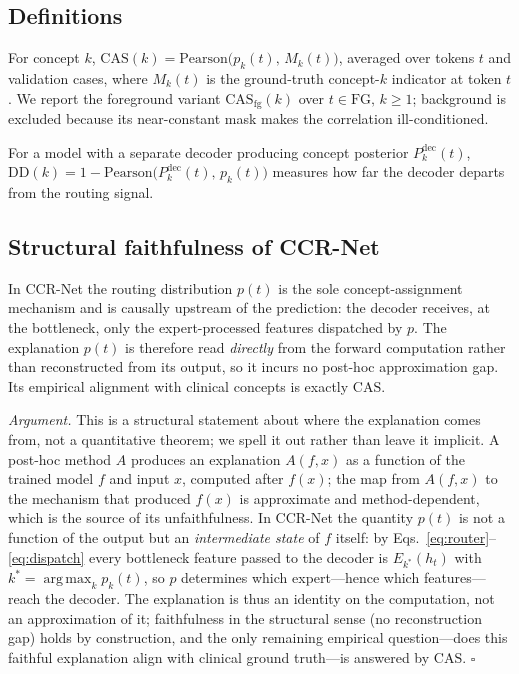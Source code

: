 \documentclass[runningheads]{llncs}
\DeclareMathOperator*{\argmax}{arg\,max}
\newcommand{\casfg}{\mathrm{CAS}_{\mathrm{fg}}}
\begin{document}
\subsection{Definitions}
\begin{definition}
For concept $k$, $\mathrm{CAS}(k)=\mathrm{Pearson}\big(p_k(t),\,M_k(t)\big)$, averaged over
tokens $t$ and validation cases, where $M_k(t)$ is the ground-truth concept-$k$ indicator
at token $t$. We report the foreground variant $\casfg(k)$ over $t\in\mathrm{FG},\,k\ge1$;
background is excluded because its near-constant mask makes the correlation ill-conditioned.
\end{definition}

\begin{definition}\label{def:dd}
For a model with a separate decoder producing concept posterior $P^{\text{dec}}_k(t)$,
$\mathrm{DD}(k)=1-\mathrm{Pearson}\big(P^{\text{dec}}_k(t),\,p_k(t)\big)$ measures how far
the decoder departs from the routing signal.
\end{definition}

\subsection{Structural faithfulness of CCR-Net}
\begin{proposition}\label{prop:1a}
In CCR-Net the routing distribution $p(t)$ is the sole concept-assignment mechanism and is
causally upstream of the prediction: the decoder receives, at the bottleneck, only the
expert-processed features dispatched by $p$. The explanation $p(t)$ is therefore read
\emph{directly} from the forward computation rather than reconstructed from its output, so
it incurs no post-hoc approximation gap. Its empirical alignment with clinical concepts is
exactly $\mathrm{CAS}$.
\end{proposition}
\noindent\emph{Argument.} This is a structural statement about where the explanation comes from,
not a quantitative theorem; we spell it out rather than leave it implicit.
A post-hoc method $A$ produces an explanation $A(f,x)$ as a function
of the trained model $f$ and input $x$, computed after $f(x)$; the map from $A(f,x)$ to the
mechanism that produced $f(x)$ is approximate and method-dependent, which is the source of
its unfaithfulness. In CCR-Net the quantity $p(t)$ is not a function of the output but an
\emph{intermediate state} of $f$ itself: by Eqs.~\ref{eq:router}--\ref{eq:dispatch} every
bottleneck feature passed to the decoder is $E_{k^\ast}(h_t)$ with
$k^\ast=\argmax_k p_k(t)$, so $p$ determines which expert---hence which features---reach the
decoder. The explanation is thus an identity on the computation, not an approximation of
it; faithfulness in the structural sense (no reconstruction gap) holds by construction, and
the only remaining empirical question---does this faithful explanation align with clinical
ground truth---is answered by $\mathrm{CAS}$. $\square$
\end{document}
